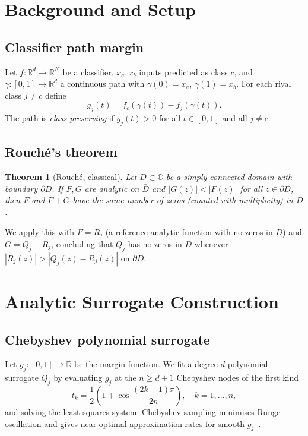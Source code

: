 \documentclass{article}
\newtheorem{theorem}{Theorem}
\theoremstyle{definition}
\newcommand{\abs}[1]{\left|#1\right|}
\begin{document}
\section{Background and Setup}
\label{sec:setup}

\subsection{Classifier path margin}

Let $f:\mathbb{R}^d\to\mathbb{R}^K$ be a classifier, $x_a, x_b$ inputs
predicted as class $c$, and $\gamma:[0,1]\to\mathbb{R}^d$ a continuous path
with $\gamma(0)=x_a$, $\gamma(1)=x_b$.  For each rival class $j\neq c$ define
\begin{equation}
  g_j(t) = f_c(\gamma(t)) - f_j(\gamma(t)).
  \label{eq:margin}
\end{equation}
The path is \emph{class-preserving} if $g_j(t)>0$ for all $t\in[0,1]$ and
all $j\neq c$.

\subsection{Rouch\'e's theorem}

\begin{theorem}[Rouch\'e, classical]
  Let $D\subset\mathbb{C}$ be a simply connected domain with boundary
  $\partial D$.  If $F,G$ are analytic on $\bar D$ and
  $\abs{G(z)}<\abs{F(z)}$ for all $z\in\partial D$, then $F$ and $F+G$
  have the same number of zeros (counted with multiplicity) in $D$.
\end{theorem}

We apply this with $F=R_j$ (a reference analytic function with no zeros in
$D$) and $G=Q_j-R_j$, concluding that $Q_j$ has no zeros in $D$ whenever
$\abs{R_j(z)}>\abs{Q_j(z)-R_j(z)}$ on $\partial D$.

\section{Analytic Surrogate Construction}
\label{sec:surrogate}

\subsection{Chebyshev polynomial surrogate}

Let $g_j:[0,1]\to\mathbb{R}$ be the margin function.  We fit a degree-$d$
polynomial surrogate $Q_j$ by evaluating $g_j$ at the $n\geq d+1$ Chebyshev
nodes of the first kind
\begin{equation}
  t_k = \frac{1}{2}\!\left(1 + \cos\frac{(2k-1)\pi}{2n}\right),
  \quad k=1,\ldots,n,
\end{equation}
and solving the least-squares system.  Chebyshev sampling minimises Runge
oscillation and gives near-optimal approximation rates for smooth
$g_j$~\cite{trefethen2013approximation}.
\end{document}
